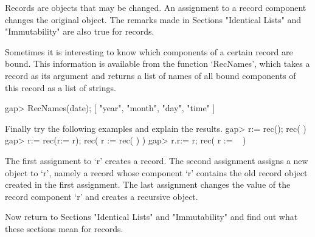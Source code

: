 Records are objects  that  may be  changed.   An assignment to  a  record
component  changes the original  object.    The remarks made in  Sections
"Identical Lists" and "Immutability" are also true for records.

Sometimes it is interesting to know which  components of a certain record
are  bound.  This information is available  from the function `RecNames',
which  takes a record as  its  argument and  returns  a list of names of
all bound components of this record as a list of strings.

\beginexample
    gap> RecNames(date);
    [ "year", "month", "day", "time" ]
\endexample

\exercise Finally try the following examples and explain the results.
\beginexample
    gap> r:= rec();
    rec(
       )
    gap> r:= rec(r:= r);
    rec(
      r := rec(
           ) )
    gap> r.r:= r;
    rec(
      r := ~ )
\endexample

\answer  The  first  assignment to `r'    creates a  record.   The second
assignment assigns a  new object to `r', namely  a record whose component
`r' contains the old record object created  in the first assignment.  The
last assignment changes the value of the record component `r' and creates
a recursive object.

Now return to Sections "Identical Lists"  and "Immutability" and find out
what these sections mean for records.

\null

